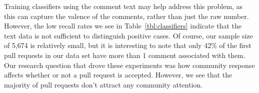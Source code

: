 \documentclass{iitthesis}
\begin{document}
Training classifiers using the comment text may help address this problem, as
this can capture the valence of the comments, rather than just the raw number.
However, the low recall rates we see in Table~\ref{tbl:classifiers} indicate
that the text data is not sufficient to distinguish positive cases. Of course,
our sample size of 5,674 is relatively small, but it is interesting to note that
only 42\% of the first pull requests in our data set have more than 1 comment
associated with them. Our research question that drove these experiments was how
community response affects whether or not a pull request is accepted. However,
we see that the majority of pull requests don't attract any community attention.







\clearpage


%
%

\appendix

%
%




\end{document}
